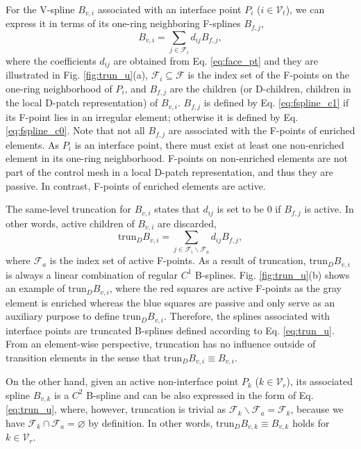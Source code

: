 \documentclass[graybox]{svmult}
\begin{document}
For the V-spline $B_{v,i}$ associated with an interface point $P_i$ ($i\in\mathcal{V}_{t}$), we can express it in terms of its one-ring neighboring F-splines $B_{f\!,j}$,
\begin{equation}
B_{v,i} = \sum_{j\in\mathcal{F}_{i}} d_{ij} B_{f\!,j},
\label{eq:bv2f}
\end{equation}
where the coefficients $d_{ij}$ are obtained from Eq. \eqref{eq:face_pt} and they are illustrated in Fig. \ref{fig:trun_u}(a), $\mathcal{F}_{i}\subseteq \mathcal{F}$ is the index set of the F-points on the one-ring neighborhood of $P_i$, and $B_{f\!,j}$ are the children (or D-children, children in the local D-patch representation) of $B_{v,i}$. $B_{f\!,j}$ is defined by Eq. \eqref{eq:fspline_c1} if its F-point lies in an irregular element; otherwise it is defined by Eq. \eqref{eq:fspline_c0}. Note that not all $B_{f\!,j}$ are associated with the F-points of enriched elements. As $P_i$ is an interface point, there must exist at least one non-enriched element in its one-ring neighborhood. F-points on non-enriched elements are not part of the control mesh in a local D-patch representation, and thus they are passive. In contrast, F-points of enriched elements are active.

The same-level truncation for $B_{v,i}$ states that $d_{ij}$ is set to be 0 if $B_{f\!,j}$ is active. In other words, active children of $B_{v,i}$ are discarded,
\begin{equation}
\mathrm{trun}_D B_{v,i} = \sum_{j\in\mathcal{F}_{i} \backslash \mathcal{F}_a } d_{ij} B_{f\!,j},
\label{eq:trun_u}
\end{equation}
where $\mathcal{F}_a$ is the index set of active F-points. As a result of truncation, $\mathrm{trun}_D B_{v,i}$ is always a linear combination of regular $C^1$ B-splines.
Fig. \ref{fig:trun_u}(b) shows an example of $\mathrm{trun}_D B_{v,i}$, where the red squares are active F-points as the gray element is enriched whereas the blue squares are passive and only serve as an auxiliary purpose to define $\mathrm{trun}_D B_{v,i}$. Therefore, the splines associated with interface points are truncated B-splines defined according to Eq. \eqref{eq:trun_u}.  From an element-wise perspective, truncation has no influence outside of transition elements in the sense that $\mathrm{trun}_D B_{v,i}\equiv B_{v,i}$. 

On the other hand, given an active non-interface point $P_k$ ($k\in\mathcal{V}_{r}$), its associated spline $B_{v,k}$ is a $C^2$ B-spline and can be also expressed in the form of Eq. \eqref{eq:trun_u}, where, however, truncation is trivial as $\mathcal{F}_{k} \backslash \mathcal{F}_a = \mathcal{F}_{k}$, because we have $\mathcal{F}_{k} \cap \mathcal{F}_a = \varnothing$ by definition. In other words, $\mathrm{trun}_D B_{v,k}\equiv B_{v,k}$ holds for $k\in\mathcal{V}_{r}$.
\end{document}
